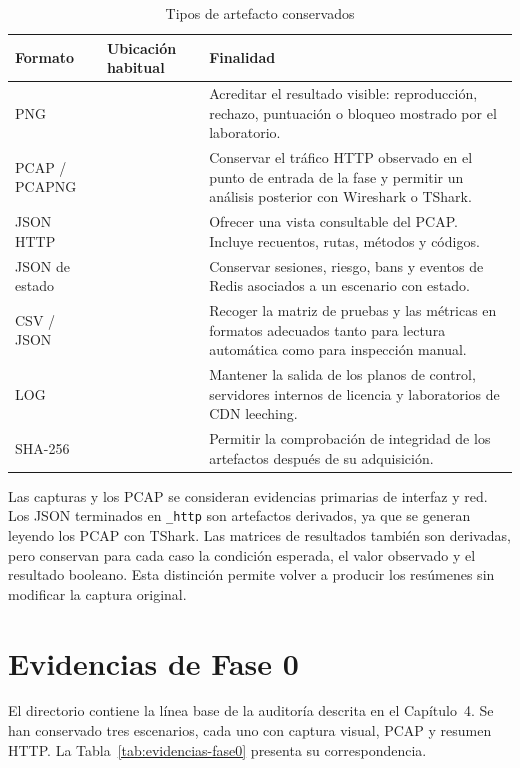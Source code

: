 \begin{table}[H]
\centering
\caption{Tipos de artefacto conservados}
\label{tab:tipos-evidencia}
\begin{tabularx}{\textwidth}{p{}p{}Y}
\toprule
\textbf{Formato} & \textbf{Ubicación habitual} & \textbf{Finalidad} \\
\midrule
PNG &  & Acreditar el resultado visible: reproducción, rechazo, puntuación o bloqueo mostrado por el laboratorio. \\
PCAP / PCAPNG &  & Conservar el tráfico HTTP observado en el punto de entrada de la fase y permitir un análisis posterior con Wireshark o TShark. \\
JSON HTTP &  & Ofrecer una vista consultable del PCAP. Incluye recuentos, rutas, métodos y códigos. \\
JSON de estado &  & Conservar sesiones, riesgo, bans y eventos de Redis asociados a un escenario con estado. \\
CSV / JSON &  & Recoger la matriz de pruebas y las métricas en formatos adecuados tanto para lectura automática como para inspección manual. \\
LOG &  & Mantener la salida de los planos de control, servidores internos de licencia y laboratorios de CDN leeching. \\
SHA-256 &  & Permitir la comprobación de integridad de los artefactos después de su adquisición. \\
\bottomrule
\end{tabularx}
\end{table}

Las capturas y los PCAP se consideran evidencias primarias de interfaz y red. Los JSON terminados en \texttt{\_http} son artefactos derivados, ya que se generan leyendo los PCAP con TShark. Las matrices de resultados también son derivadas, pero conservan para cada caso la condición esperada, el valor observado y el resultado booleano. Esta distinción permite volver a producir los resúmenes sin modificar la captura original.

\section{Evidencias de Fase 0}

El directorio  contiene la línea base de la auditoría descrita en el Capítulo~4. Se han conservado tres escenarios, cada uno con captura visual, PCAP y resumen HTTP. La Tabla~\ref{tab:evidencias-fase0} presenta su correspondencia.

